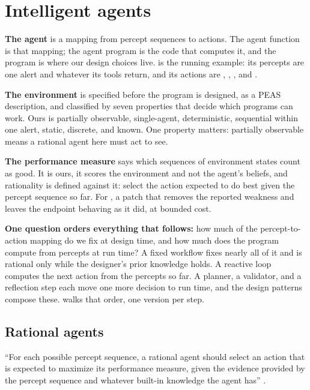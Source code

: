 \section{Intelligent agents}
\label{sec:agents}

\begin{upshot}
\item \textbf{The agent} is a mapping from percept sequences to actions. The agent function is
  that mapping; the agent program is the code that computes it, and the program is where our
  design choices live. \msa{} is the running example: its percepts are one alert and whatever
  its tools return, and its actions are , , ,
  and .
\item \textbf{The environment} is specified before the program is designed, as a PEAS
  description, and classified by seven properties that decide which programs can work. Ours is
  partially observable, single-agent, deterministic, sequential within one alert, static,
  discrete, and known. One property matters: partially observable means a rational agent here
  must act to see.
\item \textbf{The performance measure} says which sequences of environment states count as
  good. It is ours, it scores the environment and not the agent's beliefs, and rationality is
  defined against it: select the action expected to do best given the percept sequence so far.
  For \msa{}, a patch that removes the reported weakness and leaves the endpoint behaving as it
  did, at bounded cost.
\item \textbf{One question orders everything that follows:} how much of the percept-to-action mapping do we
  fix at design time, and how much does the program compute from percepts at run time? A fixed
  workflow fixes nearly all of it and is rational only while the designer's prior knowledge
  holds. A reactive loop computes the next action from the percepts so far. A planner, a
  validator, and a reflection step each move one more decision to run time, and the design
  patterns compose these. \msa{} walks that order, one version per step.
\end{upshot}

\subsection{Rational agents}
\label{sec:agents-rational}

\begin{definition}
\label{def:rational}
``For each possible percept sequence, a rational agent should select an action that is expected to maximize its performance measure, given the evidence provided by the percept sequence and whatever built-in knowledge the agent has'' \citep[\S2.2.2]{russell2020aima}.
\end{definition}


